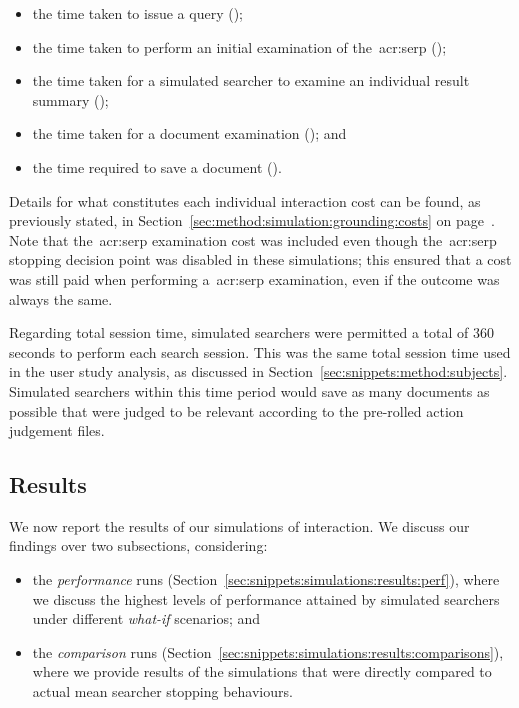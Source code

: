 \begin{itemize}
    \item{the time taken to issue a query ();}
    \item{the time taken to perform an initial examination of the~\gls{acr:serp} ();}
    \item{the time taken for a simulated searcher to examine an individual result summary ();}
    \item{the time taken for a document examination (); and}
    \item{the time required to save a document ().}
\end{itemize}

Details for what constitutes each individual interaction cost can be found, as previously stated, in Section~\ref{sec:method:simulation:grounding:costs} on page~\pageref{sec:method:simulation:grounding:costs}. Note that the~\gls{acr:serp} examination cost was included even though the~\gls{acr:serp} stopping decision point was disabled in these simulations; this ensured that a cost was still paid when performing a~\gls{acr:serp} examination, even if the outcome was always the same.

Regarding total session time, simulated searchers were permitted a total of $360$ seconds to perform each search session. This was the same total session time used in the user study analysis, as discussed in Section~\ref{sec:snippets:method:subjects}. Simulated searchers within this time period would save as many documents as possible that were judged to be relevant according to the pre-rolled action judgement files.

\subsection{Results}\label{sec:snippets:simulations:results}
We now report the results of our simulations of interaction. We discuss our findings over two subsections, considering:

\begin{itemize}
    \item{the \emph{performance} runs (Section~\ref{sec:snippets:simulations:results:perf}), where we discuss the highest levels of performance attained by simulated searchers under different \emph{what-if} scenarios; and}
    \item{the \emph{comparison} runs (Section~\ref{sec:snippets:simulations:results:comparisons}), where we provide results of the simulations that were directly compared to actual mean searcher stopping behaviours.}
\end{itemize}

